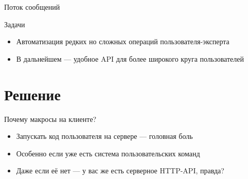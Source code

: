 \documentclass[aspectratio=169,handout,bigger]{beamer}
\begin{document}

\begin{frame}{Поток сообщений}


\end{frame}


\begin{frame}{Задачи}

\begin{itemize}
\item Автоматизация редких но сложных операций пользователя-эксперта
\item В дальнейшем --- удобное API для более широкого круга пользователей
\end{itemize}

\end{frame}


\section{Решение}


\begin{frame}{Почему макросы на клиенте?}

\begin{itemize}
\item Запускать код пользователя на сервере — головная боль
\item Особенно если уже есть система пользовательских команд
\item Даже если её нет — у вас же есть серверное HTTP-API, правда?
\end{itemize}

\end{frame}
\end{document}
